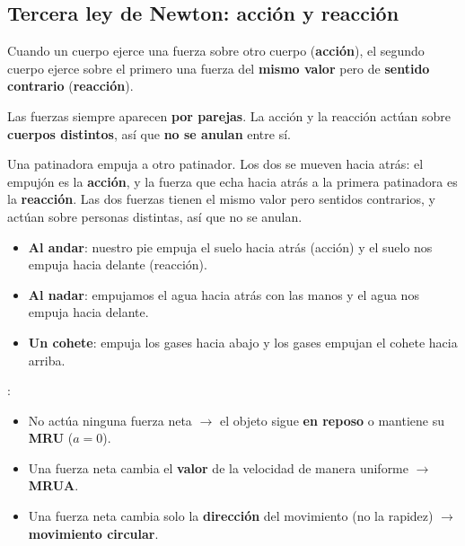 \subsection{Tercera ley de Newton: acción y reacción}

\begin{definition}
    Cuando un cuerpo ejerce una fuerza sobre otro cuerpo (\textbf{acción}), el segundo cuerpo ejerce sobre el primero una fuerza del \textbf{mismo valor} pero de \textbf{sentido contrario} (\textbf{reacción}).
\end{definition}

\begin{impt}
    Las fuerzas siempre aparecen \textbf{por parejas}. La acción y la reacción actúan sobre \textbf{cuerpos distintos}, así que \textbf{no se anulan} entre sí.
\end{impt}

\begin{example}
    Una patinadora empuja a otro patinador. Los dos se mueven hacia atrás: el empujón es la \textbf{acción}, y la fuerza que echa hacia atrás a la primera patinadora es la \textbf{reacción}. Las dos fuerzas tienen el mismo valor pero sentidos contrarios, y actúan sobre personas distintas, así que no se anulan.
\end{example}

\begin{example}
    \begin{itemize}
        \item \textbf{Al andar}: nuestro pie empuja el suelo hacia atrás (acción) y el suelo nos empuja hacia delante (reacción).
        \item \textbf{Al nadar}: empujamos el agua hacia atrás con las manos y el agua nos empuja hacia delante.
        \item \textbf{Un cohete}: empuja los gases hacia abajo y los gases empujan el cohete hacia arriba.
    \end{itemize}
\end{example}

\begin{impt}
    :
    \begin{itemize}
        \item No actúa ninguna fuerza neta \(\to\) el objeto sigue \textbf{en reposo} o mantiene su \textbf{MRU} (\(a = 0\)).
        \item Una fuerza neta cambia el \textbf{valor} de la velocidad de manera uniforme \(\to\) \textbf{MRUA}.
        \item Una fuerza neta cambia solo la \textbf{dirección} del movimiento (no la rapidez) \(\to\) \textbf{movimiento circular}.
    \end{itemize}
\end{impt}

